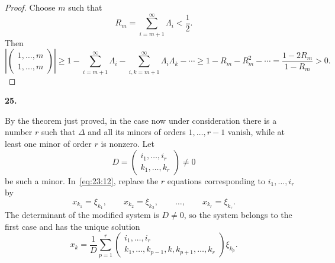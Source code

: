 \documentclass[
  paper=b5,
  fontsize=13pt,
  twoside=true,
  open=any,
  bookmarkpackage=false,
  chapterprefix=true,
  headings=normal
]{scrbook}
\theoremstyle{definition}
\newcommand{\numberedparagraph}[1]{%
  \par\medskip\phantomsection\label{sec:#1}%
  \noindent\textbf{#1.}\enspace
}
\begin{document}
\begin{proof}
Choose $m$ such that
\[
  R_m=\sum_{i=m+1}^{\infty}\Lambda_i<\frac12.
\]
Then
\[
 \left|
 \left(\begin{matrix}1,\ldots,m\\1,\ldots,m\end{matrix}\right)
 \right|
  \geq1-\sum_{i=m+1}^{\infty}\Lambda_i
       -\sum_{i,k=m+1}^{\infty}\Lambda_i\Lambda_k-\cdots
 \geq1-R_m-R_m^2-\cdots
 =\frac{1-2R_m}{1-R_m}>0.
\]
\end{proof}

\numberedparagraph{25}
By the theorem just proved, in the case now under consideration there is a number $r$ such that $\Delta$ and all its minors of orders $1,\ldots,r-1$ vanish, while at least one minor of order $r$ is nonzero. Let
\[
 D=\left(\begin{matrix}i_1,\ldots,i_r\\k_1,\ldots,k_r\end{matrix}\right)\ne0
\]
be such a minor. In~\eqref{eq:23:12}, replace the $r$ equations corresponding to $i_1,\ldots,i_r$ by
\[
  x_{k_1}=\xi_{k_1},\qquad x_{k_2}=\xi_{k_2},\qquad\ldots,
  \qquad x_{k_r}=\xi_{k_r}.
\]
The determinant of the modified system is $D\ne0$, so the system belongs to the first case and has the unique solution
\begin{equation}
 x_k=\frac1D\sum_{p=1}^{r}
 \left(\begin{matrix}
 i_1,\ldots,i_r\\
 k_1,\ldots,k_{p-1},k,k_{p+1},\ldots,k_r
 \end{matrix}\right)\xi_{k_p}.
 \tag{14}\label{eq:25:14}
\end{equation}
\end{document}
